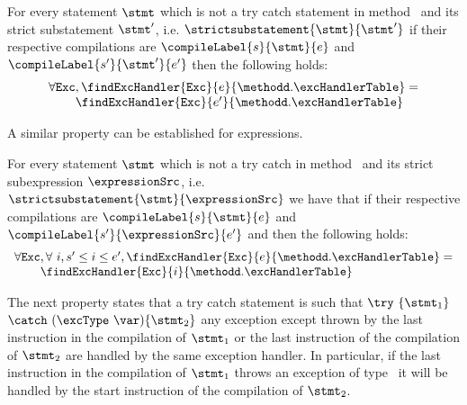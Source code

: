 \begin{compProp8}\label{compile:prop:compProp8}
  For every statement $\stmt$ which is not a try catch statement  in method \methodd \  and  its strict substatement $\stmt'$, i.e. 
$\strictsubstatement{\stmt}{\stmt'} $
if their respective compilations are  $\compileLabel{s}{\stmt}{e}$ and  $\compileLabel{s'}{\stmt'}{e'}$ then the following holds:
$$ \begin{array}{l}
          \forall \mbox{\rm\tt{Exc}}, \findExcHandler{\mbox{\rm\tt{Exc}} }{e}{\methodd.\excHandlerTable} = \\
	  \phantom{\forall \mbox{\rm\tt{Exc}} }\findExcHandler{\mbox{\rm\tt{Exc}} }{e'}{\methodd.\excHandlerTable} 
   \end{array}
$$

\end{compProp8}


A similar property can be established for expressions.
 
\begin{compProp9}\label{compile:prop:compProp9}
  For every statement $\stmt$ which is not a try catch  in method \methodd \  and  its strict  subexpression
 $\expressionSrc$, i.e. $\strictsubstatement{\stmt}{\expressionSrc}$
 we have that 
if their respective compilations are  $\compileLabel{s}{\stmt}{e}$ and  $\compileLabel{s'}{\expressionSrc}{e'}$ and 
 then the following holds:
$$ \begin{array}{l}
          \forall \mbox{\rm\tt{Exc}}, \forall  \ i, s' \le i \le e' ,  \findExcHandler{\mbox{\rm\tt{Exc}} }{e}{\methodd.\excHandlerTable} = \\
	  \phantom{\forall \mbox{\rm\tt{Exc}} }\findExcHandler{\mbox{\rm\tt{Exc}} }{i}{\methodd.\excHandlerTable} 
   \end{array}
$$
\end{compProp9}

The next property states that a try catch statement is such that $ \try \ \{ \stmt_1 \} $ $ \catch \ (\excType \ \var )\{ \stmt_2 \}  $ 
any exception except \excType{} thrown by  the last instruction in the compilation of $ \stmt_1 $ or the last instruction of the compilation 
of $ \stmt_2$ are handled by the same exception handler. In particular, if the last instruction in the compilation of
 $ \stmt_1 $ throws an exception of type \excType \  it will be handled by the start instruction of the compilation of $\stmt_2 $.

